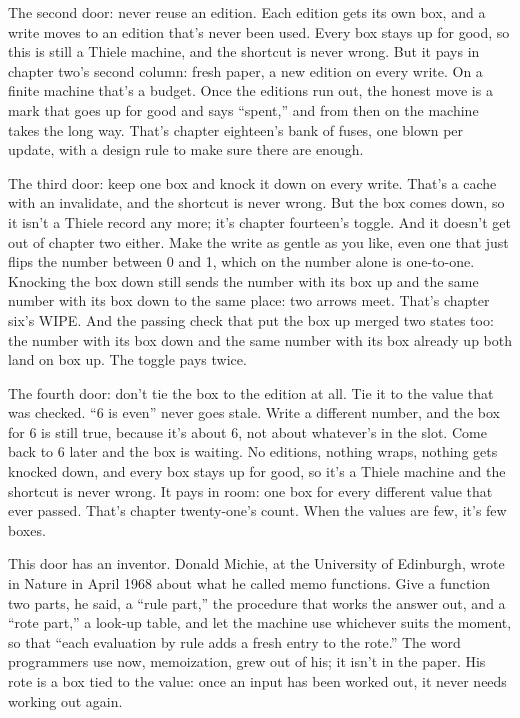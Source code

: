 \documentclass[11pt,twoside]{article}
\theoremstyle{thielethm}
\theoremstyle{thieledef}
\theoremstyle{thieledef}
\theoremstyle{thieledef}
\theoremstyle{thielethm}
\theoremstyle{thieleobs}
\theoremstyle{thielethm}
\begin{document}
The second door: never reuse an edition. Each edition gets its own box, and a write moves to an edition that's never been used. Every box stays up for good, so this is still a Thiele machine, and the shortcut is never wrong. But it pays in chapter two's second column: fresh paper, a new edition on every write. On a finite machine that's a budget. Once the editions run out, the honest move is a mark that goes up for good and says ``spent,'' and from then on the machine takes the long way. That's chapter eighteen's bank of fuses, one blown per update, with a design rule to make sure there are enough.

The third door: keep one box and knock it down on every write. That's a cache with an invalidate, and the shortcut is never wrong. But the box comes down, so it isn't a Thiele record any more; it's chapter fourteen's toggle. And it doesn't get out of chapter two either. Make the write as gentle as you like, even one that just flips the number between 0 and 1, which on the number alone is one-to-one. Knocking the box down still sends the number with its box up and the same number with its box down to the same place: two arrows meet. That's chapter six's WIPE. And the passing check that put the box up merged two states too: the number with its box down and the same number with its box already up both land on box up. The toggle pays twice.

The fourth door: don't tie the box to the edition at all. Tie it to the value that was checked. ``6 is even'' never goes stale. Write a different number, and the box for 6 is still true, because it's about 6, not about whatever's in the slot. Come back to 6 later and the box is waiting. No editions, nothing wraps, nothing gets knocked down, and every box stays up for good, so it's a Thiele machine and the shortcut is never wrong. It pays in room: one box for every different value that ever passed. That's chapter twenty-one's count. When the values are few, it's few boxes.

This door has an inventor. Donald Michie, at the University of Edinburgh, wrote in Nature in April 1968 about what he called memo functions. Give a function two parts, he said, a ``rule part,'' the procedure that works the answer out, and a ``rote part,'' a look-up table, and let the machine use whichever suits the moment, so that ``each evaluation by rule adds a fresh entry to the rote.'' The word programmers use now, memoization, grew out of his; it isn't in the paper. His rote is a box tied to the value: once an input has been worked out, it never needs working out again.
\end{document}
